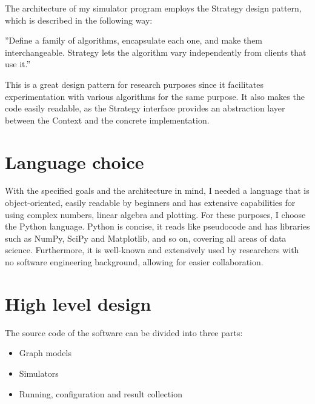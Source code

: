 The architecture of my simulator program employs the Strategy design pattern, which is described in the following way:

''Define a family of algorithms, encapsulate each one, and make them interchangeable. Strategy lets the algorithm vary independently from clients that use it.''~\cite{DesignPatterns}


This is a great design pattern for research purposes since it facilitates experimentation with various algorithms for the same purpose. It also makes the code easily readable, as the Strategy interface provides an abstraction layer between the Context and the concrete implementation.

\section{Language choice}

With the specified goals and the architecture in mind, I needed a language that is object-oriented, easily readable by beginners and has extensive capabilities for using complex numbers, linear algebra and plotting. For these purposes, I choose the Python language. Python is concise, it reads like pseudocode and has libraries such as NumPy, SciPy and Matplotlib, and so on, covering all areas of data science. Furthermore, it is well-known and extensively used by researchers with no software engineering background, allowing for easier collaboration.

\section{High level design}

The source code of the software can be divided into three parts:

\begin{itemize}
    \item Graph models
    \item Simulators
    \item Running, configuration and result collection
\end{itemize}


